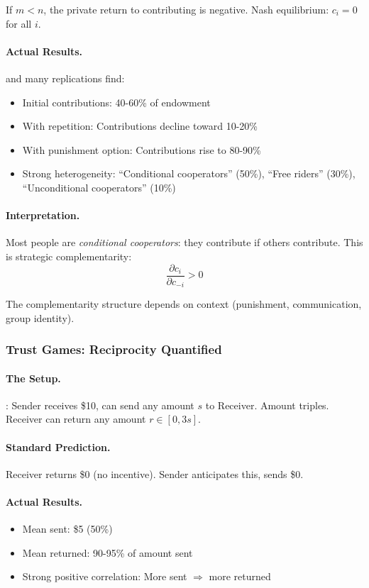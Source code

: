 \documentclass[12pt,a4paper]{article}
\begin{document}
If $m < n$, the private return to contributing is negative.
Nash equilibrium: $c_i = 0$ for all $i$.

\paragraph{Actual Results.}
\citet{fehrgaechter2000} and many replications find:
\begin{itemize}
  \item Initial contributions: 40-60\% of endowment
  \item With repetition: Contributions decline toward 10-20\%
  \item With punishment option: Contributions rise to 80-90\%
  \item Strong heterogeneity: ``Conditional cooperators'' (50\%), ``Free riders'' (30\%), ``Unconditional cooperators'' (10\%)
\end{itemize}

\paragraph{Interpretation.}
Most people are \emph{conditional cooperators}: they contribute if others contribute.
This is strategic complementarity:
\begin{equation}
  \frac{\partial c_i}{\partial c_{-i}} > 0
\end{equation}

The complementarity structure depends on context (punishment, communication, group identity).

\subsubsection{Trust Games: Reciprocity Quantified}

\paragraph{The Setup.}
\citet{bergsend1995}: Sender receives \$10, can send any amount $s$ to Receiver.
Amount triples. Receiver can return any amount $r \in [0, 3s]$.

\paragraph{Standard Prediction.}
Receiver returns \$0 (no incentive). Sender anticipates this, sends \$0.

\paragraph{Actual Results.}
\begin{itemize}
  \item Mean sent: \$5 (50\%)
  \item Mean returned: 90-95\% of amount sent
  \item Strong positive correlation: More sent $\Rightarrow$ more returned
\end{itemize}
\end{document}
